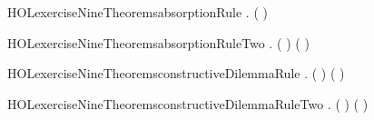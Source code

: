 \newcommand{\HOLexerciseNineDate}{02 August 2019}
\newcommand{\HOLexerciseNineTime}{20:36}
\begin{SaveVerbatim}{HOLexerciseNineTheoremsabsorptionRule}
\HOLTokenTurnstile{} \HOLSymConst{\HOLTokenForall{}} . ( \HOLSymConst{\HOLTokenImp{}} ) \HOLSymConst{\HOLTokenImp{}}  \HOLSymConst{\HOLTokenImp{}}  \HOLSymConst{\HOLTokenConj{}} 
\end{SaveVerbatim}
\newcommand{\HOLexerciseNineTheoremsabsorptionRule}{\UseVerbatim{HOLexerciseNineTheoremsabsorptionRule}}
\begin{SaveVerbatim}{HOLexerciseNineTheoremsabsorptionRuleTwo}
\HOLTokenTurnstile{} \HOLSymConst{\HOLTokenForall{}}   . ( \HOLSymConst{\HOLTokenImp{}} ) \HOLSymConst{\HOLTokenConj{}} ( \HOLSymConst{\HOLTokenImp{}} ) \HOLSymConst{\HOLTokenImp{}}  \HOLSymConst{\HOLTokenDisj{}}  \HOLSymConst{\HOLTokenImp{}}  \HOLSymConst{\HOLTokenDisj{}} 
\end{SaveVerbatim}
\newcommand{\HOLexerciseNineTheoremsabsorptionRuleTwo}{\UseVerbatim{HOLexerciseNineTheoremsabsorptionRuleTwo}}
\begin{SaveVerbatim}{HOLexerciseNineTheoremsconstructiveDilemmaRule}
\HOLTokenTurnstile{} \HOLSymConst{\HOLTokenForall{}}   . ( \HOLSymConst{\HOLTokenImp{}} ) \HOLSymConst{\HOLTokenConj{}} ( \HOLSymConst{\HOLTokenImp{}} ) \HOLSymConst{\HOLTokenImp{}}  \HOLSymConst{\HOLTokenDisj{}}  \HOLSymConst{\HOLTokenImp{}}  \HOLSymConst{\HOLTokenDisj{}} 
\end{SaveVerbatim}
\newcommand{\HOLexerciseNineTheoremsconstructiveDilemmaRule}{\UseVerbatim{HOLexerciseNineTheoremsconstructiveDilemmaRule}}
\begin{SaveVerbatim}{HOLexerciseNineTheoremsconstructiveDilemmaRuleTwo}
\HOLTokenTurnstile{} \HOLSymConst{\HOLTokenForall{}}   . ( \HOLSymConst{\HOLTokenImp{}} ) \HOLSymConst{\HOLTokenConj{}} ( \HOLSymConst{\HOLTokenImp{}} ) \HOLSymConst{\HOLTokenImp{}}  \HOLSymConst{\HOLTokenDisj{}}  \HOLSymConst{\HOLTokenImp{}}  \HOLSymConst{\HOLTokenDisj{}} 
\end{SaveVerbatim}
\newcommand{\HOLexerciseNineTheoremsconstructiveDilemmaRuleTwo}{\UseVerbatim{HOLexerciseNineTheoremsconstructiveDilemmaRuleTwo}}
\newcommand{\HOLexerciseNineTheorems}{
\HOLThmTag{exercise9}{absorptionRule}\HOLexerciseNineTheoremsabsorptionRule
\HOLThmTag{exercise9}{absorptionRule2}\HOLexerciseNineTheoremsabsorptionRuleTwo
\HOLThmTag{exercise9}{constructiveDilemmaRule}\HOLexerciseNineTheoremsconstructiveDilemmaRule
\HOLThmTag{exercise9}{constructiveDilemmaRule2}\HOLexerciseNineTheoremsconstructiveDilemmaRuleTwo
}
